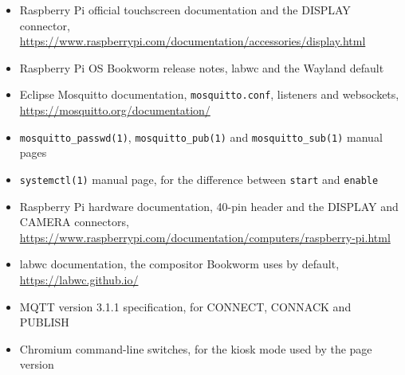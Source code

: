 \begin{itemize}
\item Raspberry Pi official touchscreen documentation and the DISPLAY connector, \url{https://www.raspberrypi.com/documentation/accessories/display.html}
\item Raspberry Pi OS Bookworm release notes, labwc and the Wayland default
\item Eclipse Mosquitto documentation, \texttt{mosquitto.conf}, listeners and websockets, \url{https://mosquitto.org/documentation/}
\item \texttt{mosquitto\_passwd(1)}, \texttt{mosquitto\_pub(1)} and \texttt{mosquitto\_sub(1)} manual pages
\item \texttt{systemctl(1)} manual page, for the difference between \texttt{start} and \texttt{enable}
\item Raspberry Pi hardware documentation, 40-pin header and the DISPLAY and CAMERA connectors, \url{https://www.raspberrypi.com/documentation/computers/raspberry-pi.html}
\item labwc documentation, the compositor Bookworm uses by default, \url{https://labwc.github.io/}
\item MQTT version 3.1.1 specification, for CONNECT, CONNACK and PUBLISH
\item Chromium command-line switches, for the kiosk mode used by the page version
\end{itemize}
